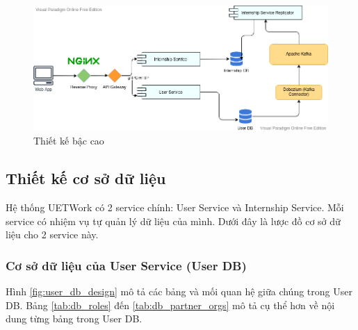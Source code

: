 \documentclass[./../main.tex]{subfiles}
\begin{document}
\begin{figure}
	\includegraphics[width=\linewidth]{./images/uetwork_architecture.png}
	\caption{Thiết kế bậc cao}
	\label{fig:high_level_design}
\end{figure}

\subsection{Thiết kế cơ sở dữ liệu}

Hệ thống UETWork có 2 service chính: User Service và Internship Service. Mỗi service có nhiệm vụ tự quản lý dữ liệu của mình. Dưới đây là lược đồ cơ sở dữ liệu cho 2 service này.

\subsubsection{Cơ sở dữ liệu của User Service (User DB)}

Hình \ref{fig:user_db_design} mô tả các bảng và mối quan hệ giữa chúng trong User DB. Bảng \ref{tab:db_roles} đến \ref{tab:db_partner_orgs} mô tả cụ thể hơn về nội dung từng bảng trong User DB.
\end{document}
